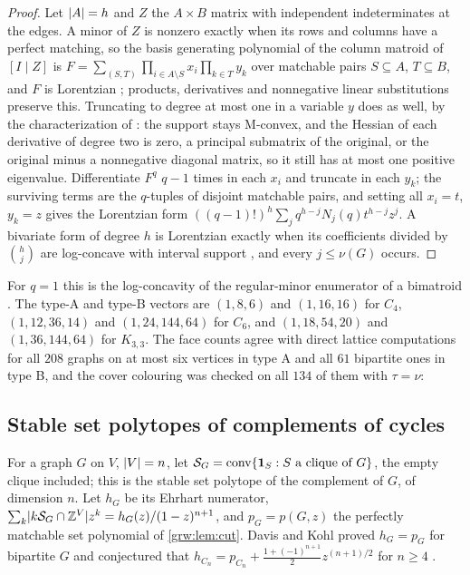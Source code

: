 \begin{proof}
Let $\lvert A\rvert=h$ and $Z$ the $A\times B$ matrix with independent
indeterminates at the edges. A minor of $Z$ is nonzero exactly when its rows
and columns have a perfect matching, so the basis generating polynomial of
the column matroid of $[I\mid Z]$ is
$F=\sum_{(S,T)}\prod_{i\in A\setminus S}x_i\prod_{k\in T}y_k$ over matchable
pairs $S\subseteq A$, $T\subseteq B$, and $F$ is Lorentzian
\cite{BrandenHuh2020Lorentzian}; products, derivatives and nonnegative
linear substitutions preserve this. Truncating to degree at most one in a
variable $y$ does as well, by the characterization of
\cite[Theorem~2.25]{BrandenHuh2020Lorentzian}: the support stays M-convex,
and the Hessian of each derivative of degree two is zero, a principal
submatrix of the original, or the original minus a nonnegative diagonal
matrix, so it still has at most one positive eigenvalue. Differentiate
$F^q$ $q-1$ times in each $x_i$ and truncate in each $y_k$; the surviving
terms are the $q$-tuples of disjoint matchable pairs, and setting all
$x_i=t$, $y_k=z$ gives the Lorentzian form
$((q-1)!)^h\sum_jq^{h-j}N_j(q)t^{h-j}z^j$. A bivariate form of degree $h$ is
Lorentzian exactly when its coefficients divided by $\binom hj$ are
log-concave with interval support \cite[Example~2.26]{BrandenHuh2020Lorentzian},
and every $j\le\nu(G)$ occurs.
\end{proof}

For $q=1$ this is the log-concavity of the regular-minor enumerator of a
bimatroid \cite{RohrleUlirsch2025Logarithmic}. The type-A and type-B vectors
are $(1,8,6)$ and $(1,16,16)$ for $C_4$, $(1,12,36,14)$ and $(1,24,144,64)$
for $C_6$, and $(1,18,54,20)$ and $(1,36,144,64)$ for $K_{3,3}$. The face
counts agree with direct lattice computations for all $208$ graphs on at
most six vertices in type A and all $61$ bipartite ones in type B, and the
cover colouring was checked on all $134$ of them with $\tau=\nu$:

\subsection{Stable set polytopes of complements of cycles}\label{grw:sec:stable}

For a graph $G$ on $V$, $\lvert V\rvert=n$, let
$\mathcal S_G=\operatorname{conv}\{\mathbf 1_S:S\text{ a clique of }G\}$, the empty
clique included; this is the stable set polytope of the complement of $G$,
of dimension $n$. Let $h_G$ be its Ehrhart numerator,
$\sum_k\lvert k\mathcal S_G\cap\mathbb{Z}^V\rvert z^k=h_G(z)/(1-z)^{n+1}$, and $p_G=p(G,z)$
the perfectly matchable set polynomial of \cref{grw:lem:cut}. Davis and Kohl
proved $h_G=p_G$ for bipartite $G$ \cite[Lemma~3.11]{DavisKohl2024Perfectly}
and conjectured that $h_{C_n}=p_{C_n}+\frac{1+(-1)^{n+1}}2z^{(n+1)/2}$ for
$n\ge4$ \cite[Conjecture~3.15]{DavisKohl2024Perfectly}.

